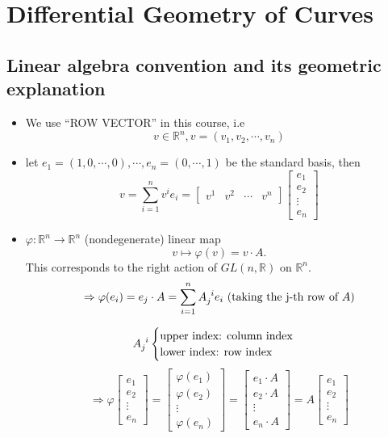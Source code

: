 \documentclass[UTF8,oneside,11pt]{book}
\theoremstyle{plain}\newtheorem{thm}{Theorem}
\theoremstyle{definition}\newtheorem{defn}[thm]{Definition}
\theoremstyle{plain}\newtheorem{axiom}[thm]{Axiom}
\theoremstyle{plain}\newtheorem{coro}[thm]{Corollary}
\theoremstyle{plain}\newtheorem{lemma}[thm]{Lemma}
\theoremstyle{plain}\newtheorem{prop}[thm]{Proposition}
\theoremstyle{plain}\newtheorem{conj}[thm]{Conjecture}
\theoremstyle{plain}\newtheorem{ques}[thm]{Problem}
\theoremstyle{plain}\newtheorem{const}[thm]{Construction}
\theoremstyle{remark}\newtheorem{notation}[thm]{Notation}
\theoremstyle{plain}\newtheorem*{app}{Application}
\theoremstyle{plain}\newtheorem*{exam}{Example}
\theoremstyle{plain}\newtheorem*{exer}{Exercise}
\theoremstyle{remark}\newtheorem*{remark}{Remark}
\theoremstyle{remark}\newtheorem*{note}{\small{Note}}
\numberwithin{equation}{section}
\numberwithin{thm}{section}
\begin{document}
\mainmatter
\chapter{Differential Geometry of Curves}
\large
\section*{Linear algebra convention and its geometric explanation}
\begin{itemize}
    \item We use ``ROW VECTOR'' in this course, i.e
    \[v\in \mathbb{R}^n, v=(v_1,v_2,\cdots,v_n)\]
    \item let $e_1=(1,0,\cdots,0),\cdots,e_n=(0,\cdots,1)$ be the standard basis, then 
    \[v=\sum_{i=1}^nv^i e_i=
    \begin{bmatrix}
        v^1& v^2& \cdots & v^n
    \end{bmatrix}
    \begin{bmatrix}
        e_1\\
        e_2\\
        \vdots\\
        e_n
    \end{bmatrix}
    \]
    \item $\varphi\colon \mathbb{R}^n\to \mathbb{R}^n$ (nondegenerate) linear map
    \[v\mapsto \varphi(v)=v\cdot A.\]
    This corresponds to the right action of $GL(n,\mathbb{R})$ on $\mathbb{R}^n$.
    \[\Rightarrow \varphi(e_i)=e_j \cdot A=\sum_{i=1}^n A\indices{_j^i}e_i\text{ (taking the j-th row of }A\text{)}\]
    
    \[A\indices{_j^i}\begin{cases}
        \text{upper index: column index}\\
        \text{lower index: row index}
    \end{cases}\]
    \[\Rightarrow \varphi\begin{bmatrix}
        e_1\\
        e_2\\
        \vdots\\
        e_n
    \end{bmatrix}=\begin{bmatrix}
       \varphi( e_1)\\
        \varphi (e_2)\\
        \vdots\\
        \varphi(e_n)
    \end{bmatrix}=\begin{bmatrix}
        e_1\cdot A\\
        e_2\cdot A\\
        \vdots\\
        e_n\cdot A
    \end{bmatrix}=
    A \begin{bmatrix}
        e_1\\
        e_2\\
        \vdots\\
        e_n
    \end{bmatrix}\]
\end{itemize}
\end{document}
